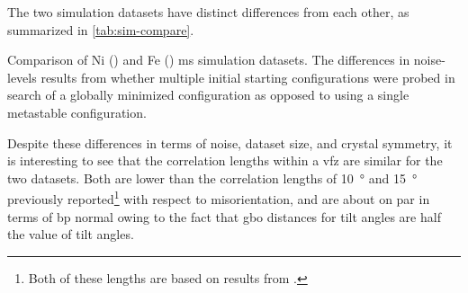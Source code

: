 \documentclass[final,twocolumn,12pt]{elsarticle}
\begin{document}
	\begin{table}[]
	\centering
	\caption{Fitted parameters for two \gls{gpr} models fitted to the 388 simulated Ni \glspl{gbe} by \citet{olmstedSurveyComputedGrain2009a} and fitted parameters for a \gls{gpr} model trained on 80\% of the Fe simulation data (\num{46883} \glspl{gb}). The first Ni model allows $\sigma$ to vary, whereas the second constrains $\sigma$ to be fixed. Mat., $\sigma_L$, $\sigma_F$, $\beta$, and $\sigma$ are the material (i.e. element), kernel length scale ($^\circ{}$), signal standard deviation ($J m^{-2}$), constant basis function ($J m^{-2}$), and input property standard deviation ($J m^{-2}$), respectively. %
	}
	\label{tab:resubloss-ni-pars}
    \end{table}
    
	The two simulation datasets have distinct differences from each other, as summarized in \cref{tab:sim-compare}.
	\begin{table}[htb!]
	    \centering
	    \caption{Comparison of Ni (\citet{olmstedSurveyComputedGrain2009}) and Fe (\citet{kimPhasefieldModeling3D2014}) \gls{ms} simulation datasets. The differences in noise-levels results from whether multiple initial starting configurations were probed in search of a globally minimized configuration as opposed to using a single metastable configuration. }
\label{tab:sim-compare}
	\end{table}
	
	Despite these differences in terms of noise, dataset size, and crystal symmetry, it is interesting to see that the correlation lengths within a \gls{vfz} are similar for the two datasets. Both are lower than the correlation lengths of \SI{10}{\degree} \cite{rohrerComparingCalculatedMeasured2010} and \SI{15}{\degree} \cite{olmstedSurveyComputedGrain2009} previously reported\footnote{Both of these lengths are based on results from \citet{olmstedSurveyComputedGrain2009}.} with respect to misorientation, and are about on par in terms of \gls{bp} normal owing to the fact that \gls{gbo} distances for tilt angles are half the value of tilt angles.
	
\end{document}
